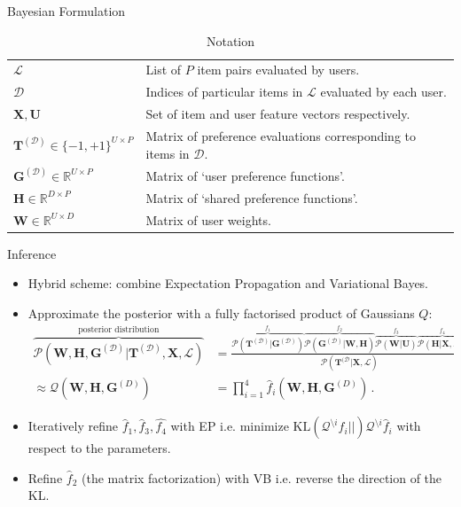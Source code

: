 \documentclass[final]{beamer}
\newlength{\onecolwid}
\newcommand{\List}{\mathcal{L}}
\begin{document}
\begin{frame}[t]
\begin{columns}[t]
\begin{column}{\onecolwid}
\begin{block}{Bayesian Formulation}
       \begin{table}
       \caption{Notation}
       \begin{tabular}{l|l}
       $\mathcal{L}$ & List of $P$ item pairs evaluated by users. \\
       $\mathcal{D}$ & Indices of particular items in $\mathcal{L}$ evaluated by each
         user. \\
       $\mathbf{X}, \mathbf{U}$  & Set of item and user feature vectors respectively. \\
       $\mathbf{T}^{(\mathcal{D})}\in \{-1,+1\}^{U\times P}$ &
         Matrix of preference evaluations corresponding to items in $\mathcal{D}$. \\
       $\mathbf{G}^{(\mathcal{D})}\in \mathbb{R}^{U\times P}$ &
         Matrix of `user preference functions'. \\
       $\mathbf{H}\in \mathbb{R}^{D\times P}$ & Matrix of `shared preference functions'. \\
       $\mathbf{W}\in \mathbb{R}^{U\times D}$ & Matrix of user weights.
       \end{tabular}
       \end{table}
    \end{block}

    \begin{block}{Inference}
       \begin{itemize}
         \item Hybrid scheme: combine Expectation Propagation and Variational Bayes.
         \item Approximate the posterior with a fully factorised product of Gaussians $Q$:
           \begin{align*}
            \overbrace{\mathcal{P}(\mathbf{W},\mathbf{H},\mathbf{G}^{(\mathcal{D})}
            |\mathbf{T}^{(\mathcal{D})},\mathbf{X},\List)}^{\text{posterior distribution}}
            &=
            \frac{\overbrace{\mathcal{P}(\mathbf{T}^{(\mathcal{D})}|\mathbf{G}^{(\mathcal{D})})}^{f_1}
            \overbrace{\mathcal{P}(\mathbf{G}^{(\mathcal{D})}|\mathbf{W},\mathbf{H})}^{f_2}
            \overbrace{\mathcal{P}(\mathbf{W}|\mathbf{U})}^{f_3}
            \overbrace{\mathcal{P}(\mathbf{H}|\mathbf{X},\List)}^{f_4}}
            {\mathcal{P}(\mathbf{T}^{(\mathcal{D}}|\mathbf{X},\List)}\,.\\
            \approx \mathcal{Q}(\mathbf{W},\mathbf{H},\mathbf{G}^{(D)}) &=
            \prod_{i=1}^4 \hat{f}_i(\mathbf{W}, \mathbf{H}, \mathbf{G}^{(D)})\,.
          \end{align*}
          \item Iteratively refine $\hat{f}_1,\hat{f}_3,\hat{f_4}$ with EP i.e. minimize
            $\mathrm{KL}(\mathcal{Q}^{\setminus i}f_i||)\mathcal{Q}^{\setminus i}\hat{f}_i$ with respect
            to the parameters.
          \item Refine $\hat{f}_2$ (the matrix factorization) with VB i.e. reverse the direction of
            the KL.
        \end{itemize}
      \end{block}


\end{column}
\end{columns}
\end{frame}
\end{document}
